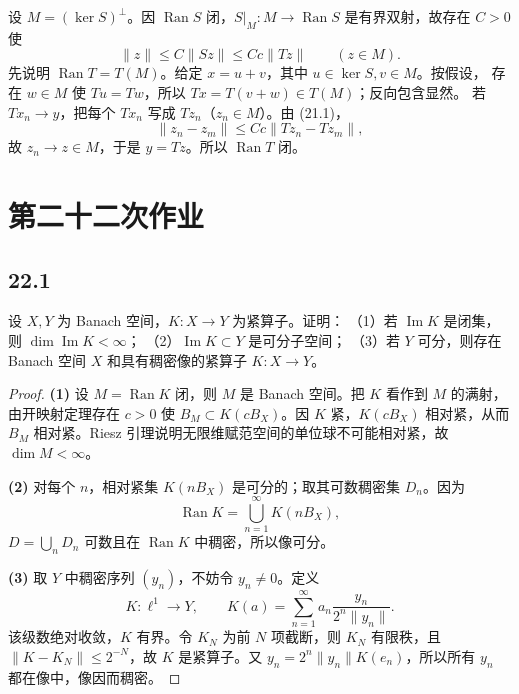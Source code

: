 设 $M=(\ker S)^\perp$。因 $\operatorname{Ran}S$ 闭，$S|_M:M\to\operatorname{Ran}S$
是有界双射，故存在 $C>0$ 使
\[
 \|z\|\leq C\|Sz\|\leq Cc\|Tz\|\qquad(z\in M). \tag{21.1}
\]
先说明 $\operatorname{Ran}T=T(M)$。给定 $x=u+v$，其中 $u\in\ker S,v\in M$。按假设，
存在 $w\in M$ 使 $Tu=Tw$，所以 $Tx=T(v+w)\in T(M)$；反向包含显然。
若 $Tx_n\to y$，把每个 $Tx_n$ 写成 $Tz_n$（$z_n\in M$）。由 (21.1)，
\[
 \|z_n-z_m\|\leq Cc\|Tz_n-Tz_m\|,
\]
故 $z_n\to z\in M$，于是 $y=Tz$。所以 $\operatorname{Ran}T$ 闭。

\section{第二十二次作业}

\subsection*{22.1}
\begin{problem}
设 $X,Y$ 为 Banach 空间，$K:X\to Y$ 为紧算子。证明：
（1）若 $\operatorname{Im}K$ 是闭集，则 $\dim\operatorname{Im}K<\infty$；
（2）$\operatorname{Im}K\subset Y$ 是可分子空间；
（3）若 $Y$ 可分，则存在 Banach 空间 $X$ 和具有稠密像的紧算子 $K:X\to Y$。
\end{problem}

\begin{proof}
\textbf{(1)} 设 $M=\operatorname{Ran}K$ 闭，则 $M$ 是 Banach 空间。把 $K$ 看作到 $M$ 的满射，
由开映射定理存在 $c>0$ 使 $B_M\subset K(cB_X)$。因 $K$ 紧，$K(cB_X)$ 相对紧，从而
$B_M$ 相对紧。Riesz 引理说明无限维赋范空间的单位球不可能相对紧，故 $\dim M<\infty$。

\textbf{(2)} 对每个 $n$，相对紧集 $K(nB_X)$ 是可分的；取其可数稠密集 $D_n$。因为
\[
 \operatorname{Ran}K=\bigcup_{n=1}^\infty K(nB_X),
\]
$D=\bigcup_nD_n$ 可数且在 $\operatorname{Ran}K$ 中稠密，所以像可分。

\textbf{(3)} 取 $Y$ 中稠密序列 $(y_n)$，不妨令 $y_n\neq0$。定义
\[
 K:\ell^1\to Y,\qquad K(a)=\sum_{n=1}^\infty a_n\frac{y_n}{2^n\|y_n\|}.
\]
该级数绝对收敛，$K$ 有界。令 $K_N$ 为前 $N$ 项截断，则 $K_N$ 有限秩，且
$\|K-K_N\|\leq2^{-N}$，故 $K$ 是紧算子。又
$y_n=2^n\|y_n\|K(e_n)$，所以所有 $y_n$ 都在像中，像因而稠密。
\end{proof}

